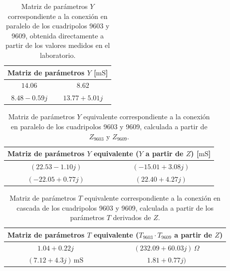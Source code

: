\begin{table}[H]
\centering
\begin{tabular}{|c|c|}
\hline
\multicolumn{2}{|c|}{\textbf{Matriz de parámetros $Y$  [$\mathrm{mS}$]}} \\ \hline
$14.06\, $ & $8.62\, $ \\ \hline
$8.48 - 0.59j\, $ & $13.77 + 5.01 j\,$ \\ \hline
\end{tabular}
\caption{Matriz de parámetros $Y$ correspondiente a la conexión en paralelo de los cuadripolos 9603 y 9609, obtenida directamente a partir de los valores medidos en el laboratorio.}
\label{tab:matriz_Y_paralelo_directa}
\end{table}

\begin{table}[H]
\centering
\begin{tabular}{|c|c|}
\hline
\multicolumn{2}{|c|}{\textbf{Matriz de parámetros $Y$ equivalente ($Y$ a partir de $Z$) [$\mathrm{mS}$]}} \\ \hline
$(22.53 - 1.10j)\,$ & $(-15.01 + 3.08j)\,$ \\ \hline
$(-22.05 + 0.77j)\,$ & $(22.40 + 4.27j)\,$ \\ \hline
\end{tabular}
\caption{Matriz de parámetros $Y$ equivalente correspondiente a la conexión en paralelo de los cuadripolos 9603 y 9609, calculada a partir de $Z_{9603}$ y $Z_{9609}$.}
\label{tab:matriz_Y_paralelo_desdeZ}
\end{table}

\begin{table}[H]
\centering
\begin{tabular}{|c|c|}
\hline
\multicolumn{2}{|c|}{\textbf{Matriz de parámetros $T$ equivalente ($T_{9603} \cdot T_{9609}$ a partir de $Z$)}} \\ \hline
$1.04 + 0.22j$ & $(232.09 + 60.03j)\,\Omega$ \\ \hline
$(7.12 + 4.3 j)\,\mathrm{mS}$ & $1.81 + 0.77

j)$ \\ \hline
\end{tabular}
\caption{Matriz de parámetros $T$ equivalente correspondiente a la conexión en cascada de los cuadripolos 9603 y 9609, calculada a partir de los parámetros $T$ derivados de $Z$.}
\label{tab:matriz_T_cascada_desdeZ}
\end{table}
